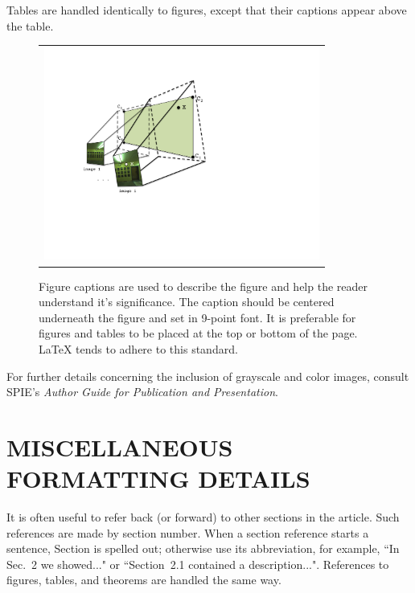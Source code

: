\documentclass[]{spie}  %
\begin{document}
Tables are handled identically to figures, except that their captions appear above the table. 
   \begin{figure}
   \begin{center}
   \begin{tabular}{c}
   \includegraphics[height=7cm]{Projection.pdf}
   \end{tabular}
   \end{center}
   \caption[example] 
   { \label{fig:example} 
Figure captions are used to describe the figure and help the reader understand it's significance.  The caption should be centered underneath the figure and set in 9-point font.  It is preferable for figures and tables to be placed at the top or bottom of the page. LaTeX tends to adhere to this standard.}
   \end{figure} 

For further details concerning the inclusion of grayscale and color images, consult SPIE's {\it Author Guide for Publication and Presentation}.
 
\appendix    %
\section{MISCELLANEOUS FORMATTING DETAILS} \label{sec:misc}

It is often useful to refer back (or forward) to other sections in the article.  Such references are made by section number.  When a section reference starts a sentence, Section is spelled out; otherwise use its abbreviation, for example, ``In Sec.~2 we showed..." or ``Section~2.1 contained a description...".  References to figures, tables, and theorems are handled the same way.
\end{document}
